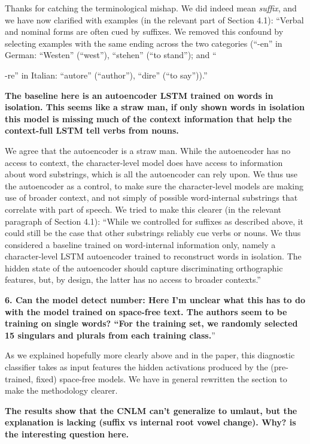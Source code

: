 \documentclass{article}
\begin{document}
Thanks for catching the terminological mishap. We did indeed mean \emph{suffix}, and we have now clarified with examples (in the relevant part of Section 4.1): ``Verbal and nominal forms are often cued by suffixes. We removed this confound by selecting examples with the same ending across the two categories (``-en'' in German: ``Westen'' (``west''), ``stehen'' (``to stand''); and ``{-re'' in Italian: ``autore'' (``author''), ``dire'' (``to say'')).''
\newline

\textbf{The baseline here is an autoencoder LSTM trained on words in isolation.  This seems like a straw man, if only shown words in isolation this model is missing much of the context information that help the context-full LSTM tell verbs from nouns.}

We agree that the autoencoder is a straw man. While the autoencoder has no access to context, the character-level model does have access to information about word substrings, which is all the autoencoder can rely upon. We thus use the autoencoder as a control, to make sure the character-level models are making use of broader context, and not simply of possible word-internal substrings that correlate with part of speech. We tried to make this clearer (in the relevant paragraph of Section 4.1): ``While we controlled for suffixes as described above, it could still be the case that other substrings reliably cue verbs or nouns. We thus considered a baseline trained on word-internal information only, namely a character-level LSTM autoencoder trained to reconstruct words in isolation.  The hidden state of the autoencoder should capture discriminating orthographic features, but, by design, the latter has no access to broader contexts.'' 
\newline

\textbf{6. Can the model detect number: Here I'm unclear what this has to do with the model trained on space-free text.  The authors seem to be training on single words? ``For the training set, we randomly selected 15 singulars and plurals from each training class.}''

As we explained hopefully more clearly above and in the paper, this diagnostic classifier takes as input features the hidden activations produced by the (pre-trained, fixed) space-free models. We have in general rewritten the section to make the methodology clearer.
\newline

\textbf{The results show that the CNLM can't generalize to umlaut, but the explanation is lacking (suffix vs internal root vowel change).  Why? is the interesting question here.}

}
\end{document}

